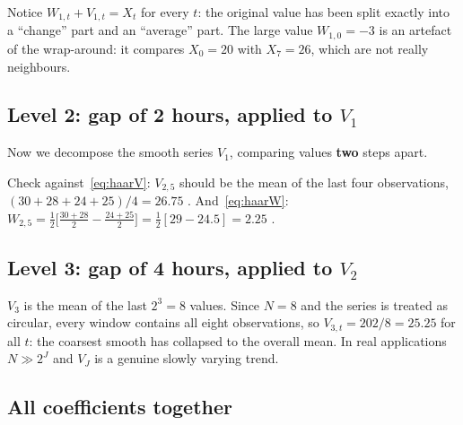 \documentclass[11pt,a4paper]{article}
\begin{document}
\begin{table}[H]
\centering

\caption{Level 1. Example: $W_{1,4}=(28-24)/2=2$ and $V_{1,4}=(28+24)/2=26$.}
\end{table}

Notice $W_{1,t}+V_{1,t}=X_t$ for every $t$: the original value has been split exactly into a ``change''
part and an ``average'' part. The large value $W_{1,0}=-3$ is an artefact of the wrap-around: it compares
$X_0=20$ with $X_7=26$, which are not really neighbours.

\subsection{Level 2: gap of 2 hours, applied to $V_1$}

Now we decompose the smooth series $V_1$, comparing values \textbf{two} steps apart.

\begin{table}[H]
\centering

\caption{Level 2. Example: $W_{2,5}=(29-24.5)/2=2.25$ and $V_{2,5}=(29+24.5)/2=26.75$.}
\end{table}

Check against~\eqref{eq:haarV}: $V_{2,5}$ should be the mean of the last four observations,
$(30+28+24+25)/4 = 26.75$ \checkmark. And~\eqref{eq:haarW}: $W_{2,5}=\tfrac12\big[\tfrac{30+28}{2}-\tfrac{24+25}{2}\big]
=\tfrac12[29-24.5]=2.25$ \checkmark.

\subsection{Level 3: gap of 4 hours, applied to $V_2$}

\begin{table}[H]
\centering

\caption{Level 3. Example: $W_{3,7}=(27.75-22.75)/2=2.5$.}
\end{table}

$V_3$ is the mean of the last $2^3=8$ values. Since $N=8$ and the series is treated as circular, every
window contains all eight observations, so $V_{3,t}=202/8=25.25$ for all $t$: the coarsest smooth has
collapsed to the overall mean. In real applications $N\gg 2^J$ and $V_J$ is a genuine slowly varying trend.

\subsection{All coefficients together}
\end{document}
